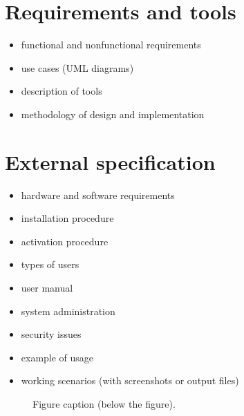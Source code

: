\documentclass[a4paper,twoside,12pt]{book}
\begin{document}




\chapter{Requirements and tools}

\begin{itemize}
\item functional and nonfunctional requirements
\item use cases (UML diagrams)
\item description of tools
\item methodology of design and implementation
\end{itemize} 

\chapter{External specification}
\begin{itemize}
\item hardware and software requirements
\item installation procedure
\item activation procedure
\item types of users
\item user manual
\item system administration
\item security issues
\item example of usage
\item working scenarios (with screenshots or output files)
\end{itemize}



 
\begin{figure}
\centering
{}
\caption{Figure caption (below the figure).}
\label{fig:2}
\end{figure}
\end{document}
